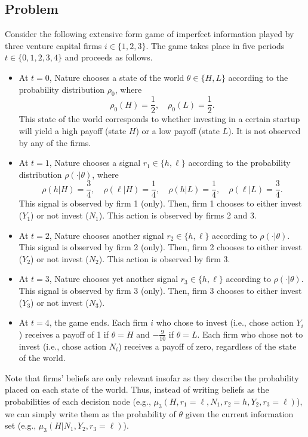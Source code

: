 \documentclass[10pt, a4paper]{article}
\begin{document}
    \subsection*{Problem}
      Consider the following extensive form game of imperfect information played by three venture capital firms $i \in \{1, 2, 3\}$. The game takes place in five periods $t \in \{0, 1, 2, 3, 4\}$ and proceeds as follows.
      \begin{itemize}
          \item At $t = 0$, Nature chooses a state of the world $\theta \in \{H, L\}$ according to the probability distribution $\rho_0$, where
          \[
          \rho_0(H) = \frac{1}{2}, \quad \rho_0(L) = \frac{1}{2}.
          \]
          This state of the world corresponds to whether investing in a certain startup will yield a high payoff (state $H$) or a low payoff (state $L$). It is not observed by any of the firms.
          \item At $t = 1$, Nature chooses a signal $r_1 \in \{h, \ell\}$ according to the probability distribution $\rho(\cdot|\theta)$, where
          \[
          \rho(h|H) = \frac{3}{4}, \quad \rho(\ell|H) = \frac{1}{4}, \quad \rho(h|L) = \frac{1}{4}, \quad \rho(\ell|L) = \frac{3}{4}.
          \]
          This signal is observed by firm 1 (only). Then, firm 1 chooses to either invest ($Y_1$) or not invest ($N_1$). This action is observed by firms 2 and 3.
          \item At $t = 2$, Nature chooses another signal $r_2 \in \{h, \ell\}$ according to $\rho(\cdot|\theta)$. This signal is observed by firm 2 (only). Then, firm 2 chooses to either invest ($Y_2$) or not invest ($N_2$). This action is observed by firm 3.
          \item At $t = 3$, Nature chooses yet another signal $r_3 \in \{h, \ell\}$ according to $\rho(\cdot|\theta)$. This signal is observed by firm 3 (only). Then, firm 3 chooses to either invest ($Y_3$) or not invest ($N_3$).
          \item At $t = 4$, the game ends. Each firm $i$ who chose to invest (i.e., chose action $Y_i$) receives a payoff of 1 if $\theta = H$ and $-\frac{9}{10}$ if $\theta = L$. Each firm who chose not to invest (i.e., chose action $N_i$) receives a payoff of zero, regardless of the state of the world.
      \end{itemize}
      Note that firms’ beliefs are only relevant insofar as they describe the probability placed on each state of the world. Thus, instead of writing beliefs as the probabilities of each decision node (e.g., $\mu_3(H, r_1 = \ell, N_1, r_2 = h, Y_2, r_3 = \ell)$), we can simply write them as the probability of $\theta$ given the current information set (e.g., $\mu_3(H|N_1, Y_2, r_3 = \ell)$).
\end{document}
